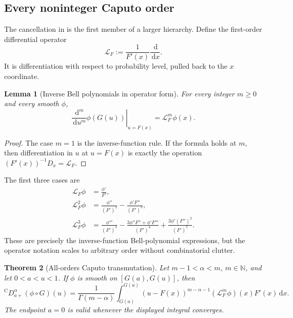 \documentclass[11pt,oneside]{article}
\newtheorem{theorem}{Theorem}[section]
\newtheorem{lemma}[theorem]{Lemma}
\theoremstyle{definition}
\theoremstyle{remark}
\newcommand{\N}{\mathbb N}
\newcommand{\dd}{\,\mathrm d}
\newcommand{\Caputo}{\mathrm C}
\newcommand{\LapF}{\mathcal L_F}
\begin{document}
\subsection{Every noninteger Caputo order}

The cancellation in  is the first member of a
larger hierarchy.  Define the first-order differential operator
\begin{equation}
 \LapF:=\frac1{F'(x)}\frac{\dd}{\dd x}.
 \label{eq:L-F-def}
\end{equation}
It is differentiation with respect to probability level, pulled back to the
$x$ coordinate.

\begin{lemma}[Inverse Bell polynomials in operator form]
For every integer $m\ge0$ and every smooth $\phi$,
\begin{equation}
 \left.\frac{\dd^m}{\dd u^m}\phi(G(u))\right|_{u=F(x)}
 =\LapF^m\phi(x).
 \label{eq:L-F-chain}
\end{equation}
\end{lemma}

\begin{proof}
The case $m=1$ is the inverse-function rule.  If the formula holds at $m$,
then differentiation in $u$ at $u=F(x)$ is exactly the operation
$(F'(x))^{-1}D_x=\LapF$.
\end{proof}

The first three cases are
\begin{align}
 \LapF\phi
 &=\frac{\phi'}{F'},\\
 \LapF^2\phi
 &=\frac{\phi''}{(F')^2}-\frac{\phi'F''}{(F')^3},\\
 \LapF^3\phi
 &=\frac{\phi'''}{(F')^3}
 -\frac{3\phi''F''+\phi'F'''}{(F')^4}
 +\frac{3\phi'(F'')^2}{(F')^5}.
 \label{eq:first-LF-powers}
\end{align}
These are precisely the inverse-function Bell-polynomial expressions, but the
operator notation scales to arbitrary order without combinatorial clutter.

\begin{theorem}[All-orders Caputo transmutation]
\label{thm:all-caputo}
Let $m-1<\alpha<m$, $m\in\N$, and let $0<a<u<1$.  If $\phi$ is smooth on
$[G(a),G(u)]$, then
\begin{equation}
 {}^{\Caputo}D_{a+}^{\alpha}(\phi\circ G)(u)
 =\frac1{\Gamma(m-\alpha)}
  \int_{G(a)}^{G(u)}
  (u-F(x))^{m-\alpha-1}
  (\LapF^m\phi)(x)F'(x)\dd x.
 \label{eq:all-order-caputo-transmutation}
\end{equation}
The endpoint $a=0$ is valid whenever the displayed integral converges.
\end{theorem}
\end{document}
